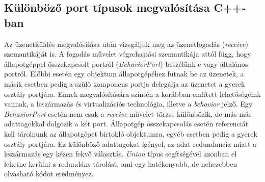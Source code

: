 \documentclass[a4paper,12pt]{report}
\begin{document}
\subsection{Különböző port típusok megvalósítása C++-ban}
Az üzenetküldés megvalósítása után vizsgáljuk meg az üzenetfogadás (\textit{receive}) szemantikáját is. A fogadás művelet végrehajtási szemantikája attól függ, hogy állapotgéppel összekapcsolt portról (\textit{BehaviorPort}) beszélünk-e vagy általános portról. Előbbi esetén egy objektum állapotgépéhez futnak be az üzenetek, a másik esetben pedig a szülő komponens portja delegálja az üzenetet a gyerek osztály portjára. Ennek megvalósítására szintén a korábban említett lehetőségeink vannak, a leszármazás és virtualizációs technológia, illetve a \textit{behavior} jelző. Egy \textit{BehaviorPort} esetén nem csak a \textit{receive} művelet törzse különbözik, de más-más adattagokkal dolgozik a két port. Állapotgép összekapcsolás esetén referenciát kell tárolnunk az állapotgépet birtokló objektumra, egyéb esetben pedig a gyerek osztály portjára. Ez különböző adattagokat igényel, az adat redundancia miatt a leszármazás egy kézen fekvő választás. \textit{Union} típus segítségével azonban el lehetne kerülni a redundáns tárolást, ami egy hatékonyabb, de nehezebben olvasható kódot eredményez.
\end{document}
